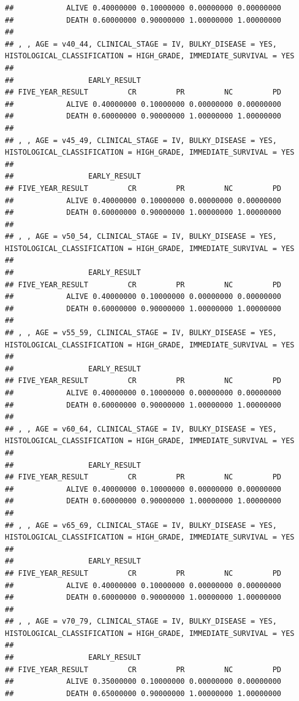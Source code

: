 \documentclass[]{article}
\begin{document}
\begin{verbatim}
##            ALIVE 0.40000000 0.10000000 0.00000000 0.00000000
##            DEATH 0.60000000 0.90000000 1.00000000 1.00000000
## 
## , , AGE = v40_44, CLINICAL_STAGE = IV, BULKY_DISEASE = YES, HISTOLOGICAL_CLASSIFICATION = HIGH_GRADE, IMMEDIATE_SURVIVAL = YES
## 
##                 EARLY_RESULT
## FIVE_YEAR_RESULT         CR         PR         NC         PD
##            ALIVE 0.40000000 0.10000000 0.00000000 0.00000000
##            DEATH 0.60000000 0.90000000 1.00000000 1.00000000
## 
## , , AGE = v45_49, CLINICAL_STAGE = IV, BULKY_DISEASE = YES, HISTOLOGICAL_CLASSIFICATION = HIGH_GRADE, IMMEDIATE_SURVIVAL = YES
## 
##                 EARLY_RESULT
## FIVE_YEAR_RESULT         CR         PR         NC         PD
##            ALIVE 0.40000000 0.10000000 0.00000000 0.00000000
##            DEATH 0.60000000 0.90000000 1.00000000 1.00000000
## 
## , , AGE = v50_54, CLINICAL_STAGE = IV, BULKY_DISEASE = YES, HISTOLOGICAL_CLASSIFICATION = HIGH_GRADE, IMMEDIATE_SURVIVAL = YES
## 
##                 EARLY_RESULT
## FIVE_YEAR_RESULT         CR         PR         NC         PD
##            ALIVE 0.40000000 0.10000000 0.00000000 0.00000000
##            DEATH 0.60000000 0.90000000 1.00000000 1.00000000
## 
## , , AGE = v55_59, CLINICAL_STAGE = IV, BULKY_DISEASE = YES, HISTOLOGICAL_CLASSIFICATION = HIGH_GRADE, IMMEDIATE_SURVIVAL = YES
## 
##                 EARLY_RESULT
## FIVE_YEAR_RESULT         CR         PR         NC         PD
##            ALIVE 0.40000000 0.10000000 0.00000000 0.00000000
##            DEATH 0.60000000 0.90000000 1.00000000 1.00000000
## 
## , , AGE = v60_64, CLINICAL_STAGE = IV, BULKY_DISEASE = YES, HISTOLOGICAL_CLASSIFICATION = HIGH_GRADE, IMMEDIATE_SURVIVAL = YES
## 
##                 EARLY_RESULT
## FIVE_YEAR_RESULT         CR         PR         NC         PD
##            ALIVE 0.40000000 0.10000000 0.00000000 0.00000000
##            DEATH 0.60000000 0.90000000 1.00000000 1.00000000
## 
## , , AGE = v65_69, CLINICAL_STAGE = IV, BULKY_DISEASE = YES, HISTOLOGICAL_CLASSIFICATION = HIGH_GRADE, IMMEDIATE_SURVIVAL = YES
## 
##                 EARLY_RESULT
## FIVE_YEAR_RESULT         CR         PR         NC         PD
##            ALIVE 0.40000000 0.10000000 0.00000000 0.00000000
##            DEATH 0.60000000 0.90000000 1.00000000 1.00000000
## 
## , , AGE = v70_79, CLINICAL_STAGE = IV, BULKY_DISEASE = YES, HISTOLOGICAL_CLASSIFICATION = HIGH_GRADE, IMMEDIATE_SURVIVAL = YES
## 
##                 EARLY_RESULT
## FIVE_YEAR_RESULT         CR         PR         NC         PD
##            ALIVE 0.35000000 0.10000000 0.00000000 0.00000000
##            DEATH 0.65000000 0.90000000 1.00000000 1.00000000

\end{verbatim}
\end{document}
